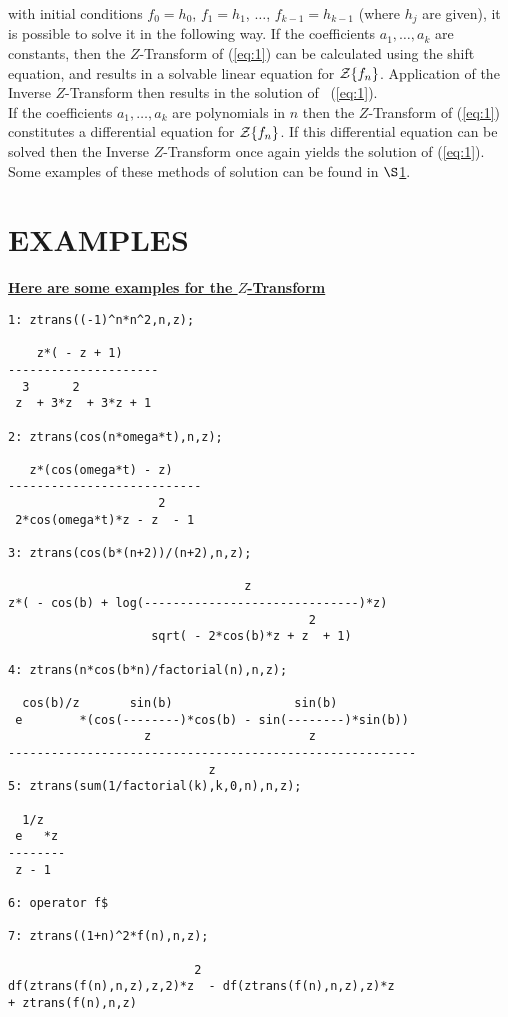   with initial conditions
  $f_0 = h_0$, $f_1 = h_1$, $\ldots$, $f_{k-1} = h_{k-1}$ (where $h_j$
  are given), it is possible to solve it in the following way.
   If the coefficients $a_1, \ldots , a_k$ are constants, then the 
  $Z$-Transform of (\ref{eq:1}) can be calculated using the shift
  equation, and results in a solvable linear equation for 
  ${\cal Z} \{f_n\}$. Application of the Inverse $Z$-Transform
  then results in the solution of \ (\ref{eq:1}).\\
  If the coefficients $a_1, \ldots , a_k$ are polynomials in $n$ then
  the $Z$-Transform of (\ref{eq:1}) constitutes a differential
  equation for ${\cal Z} \{f_n\}$. If this differential equation can
  be solved then the Inverse $Z$-Transform once again yields the
  solution of (\ref{eq:1}).
  Some examples of these methods of solution can be found in
  $\S$\ref{sec:Examples}.

\section{EXAMPLES}
\label{sec:Examples}
\underline {{\bf Here are some examples for the $Z$-Transform}}\\
\begin{verbatim}
1: ztrans((-1)^n*n^2,n,z);

    z*( - z + 1)
---------------------
  3      2
 z  + 3*z  + 3*z + 1

2: ztrans(cos(n*omega*t),n,z);

   z*(cos(omega*t) - z)
---------------------------
                     2
 2*cos(omega*t)*z - z  - 1

3: ztrans(cos(b*(n+2))/(n+2),n,z);

                                 z
z*( - cos(b) + log(------------------------------)*z)
                                          2
                    sqrt( - 2*cos(b)*z + z  + 1)

4: ztrans(n*cos(b*n)/factorial(n),n,z);

  cos(b)/z       sin(b)                 sin(b)
 e        *(cos(--------)*cos(b) - sin(--------)*sin(b))
                   z                      z
---------------------------------------------------------
                            z
5: ztrans(sum(1/factorial(k),k,0,n),n,z);

  1/z
 e   *z
--------
 z - 1

6: operator f$

7: ztrans((1+n)^2*f(n),n,z);

                          2
df(ztrans(f(n),n,z),z,2)*z  - df(ztrans(f(n),n,z),z)*z 
+ ztrans(f(n),n,z)

\end{verbatim}

